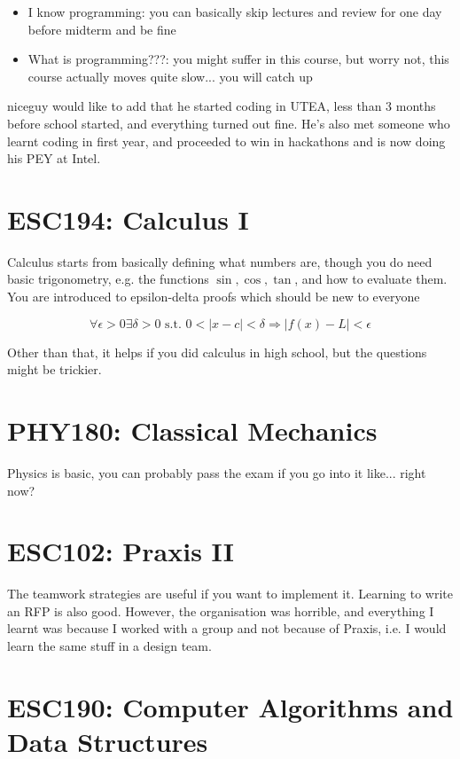\begin{itemize}
    \item I know programming: you can basically skip lectures and review for one day before midterm and be fine
    \item What is programming???: you might suffer in this course, but worry not, this course actually moves quite slow... you will catch up
\end{itemize}

niceguy would like to add that he started coding in UTEA, less than 3 months before school started, and everything turned out fine. He's also met someone who learnt coding in first year, and proceeded to win in hackathons and is now doing his PEY at Intel.

\section{ESC194: Calculus I}

Calculus starts from basically defining what numbers are, though you do need basic trigonometry, e.g. the functions $\sin, \cos, \tan$, and how to evaluate them. You are introduced to epsilon-delta proofs which should be new to everyone

$$\forall \epsilon > 0 \exists \delta > 0 \text{ s.t. } 0 < |x-c| < \delta \Rightarrow |f(x)-L| < \epsilon$$

Other than that, it helps if you did calculus in high school, but the questions might be trickier.

\section{PHY180: Classical Mechanics}

Physics is basic, you can probably pass the exam if you go into it like... right now?

\section{ESC102: Praxis II}

The teamwork strategies are useful if you want to implement it. Learning to write an RFP is also good. However, the organisation was horrible, and everything I learnt was because I worked with a group and not because of Praxis, i.e. I would learn the same stuff in a design team.

\section{ESC190: Computer Algorithms and Data Structures}

